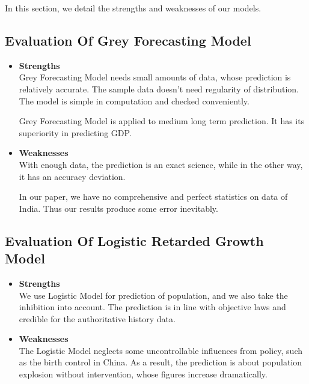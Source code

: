 \documentclass[tcn = 45538, sheet = true, abstract = true]{mcmthesis}
\begin{document}
\hspace{1.5 em}In this section, 
we detail the strengths and weaknesses of our models.

\subsection{Evaluation Of Grey Forecasting Model}

\begin{itemize}

\item \textbf{Strengths} \\

Grey Forecasting Model needs small amounts of data, 
whose prediction is relatively accurate. 
The sample data doesn't need regularity of distribution. 
The model is simple in computation and checked conveniently. 

Grey Forecasting Model is applied to medium long term prediction. 
It has its superiority in predicting GDP.

\item \textbf{Weaknesses} \\

With enough data, 
the prediction is an exact science, 
while in the other way, 
it has an accuracy deviation.

In our paper, 
we have no comprehensive and perfect statistics on data of India. 
Thus our results produce some error inevitably.

\end{itemize}

\subsection{Evaluation Of Logistic Retarded Growth Model}

\begin{itemize}

\item \textbf{Strengths} \\

We use Logistic Model for prediction of population, 
and we also take the inhibition into account. 
The prediction is in line with objective laws and credible for the authoritative history data.

\item \textbf{Weaknesses} \\

The Logistic Model neglects some uncontrollable influences from policy, 
such as the birth control in China. 
As a result, 
the prediction is about population explosion without intervention, 
whose figures increase dramatically.

\end{itemize}
\end{document}
